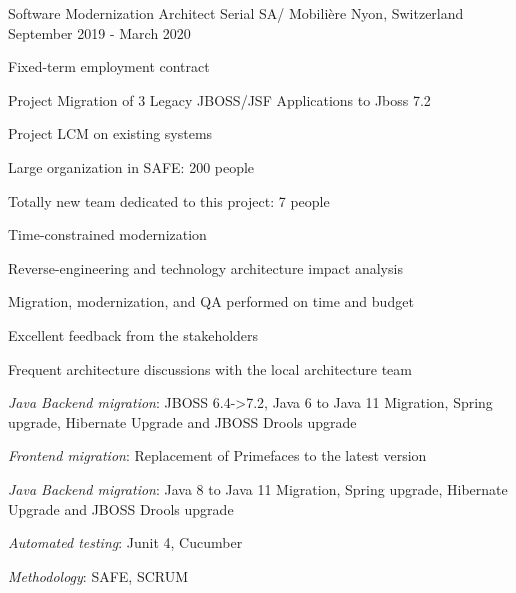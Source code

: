 \begin{cventries}
        \cventry
        {Software Modernization Architect} %
        {Serial SA/ Mobilière} %
        {Nyon, Switzerland} %
        {September 2019 - March 2020} %
        {
            \experience
            {
                \begin{cvitems} %
                    \item{Fixed-term employment contract}
                    \item{Project Migration of 3 Legacy JBOSS/JSF Applications to Jboss 7.2}
                    \item{Project LCM on existing systems}
                    \item{Large organization in SAFE: 200 people}
                    \item{Totally new team dedicated to this project: 7 people}
                    \item{Time-constrained modernization}
                    \item{Reverse-engineering and technology architecture impact analysis}
                \end{cvitems}
            }
            {
                \begin{cvitems} %
                    \item{Migration, modernization, and QA performed on time and budget}
                    \item{Excellent feedback from the stakeholders}
                    \item{Frequent architecture discussions with the local architecture team}
                \end{cvitems}
            }
            {
                \begin{cvitems} %
                    \item{\emph{Java Backend migration}: JBOSS 6.4->7.2, Java 6 to Java 11 Migration, Spring upgrade, Hibernate Upgrade and JBOSS Drools upgrade}
                    \item{\emph{Frontend migration}: Replacement of Primefaces to the latest version}
                    \item{\emph{Java Backend migration}: Java 8 to Java 11 Migration, Spring upgrade, Hibernate Upgrade and JBOSS Drools upgrade}
                    \item{\emph{Automated testing}: Junit 4, Cucumber}
                    \item{\emph{Methodology}: SAFE, SCRUM}
                \end{cvitems}
            }
        }


\end{cventries}
